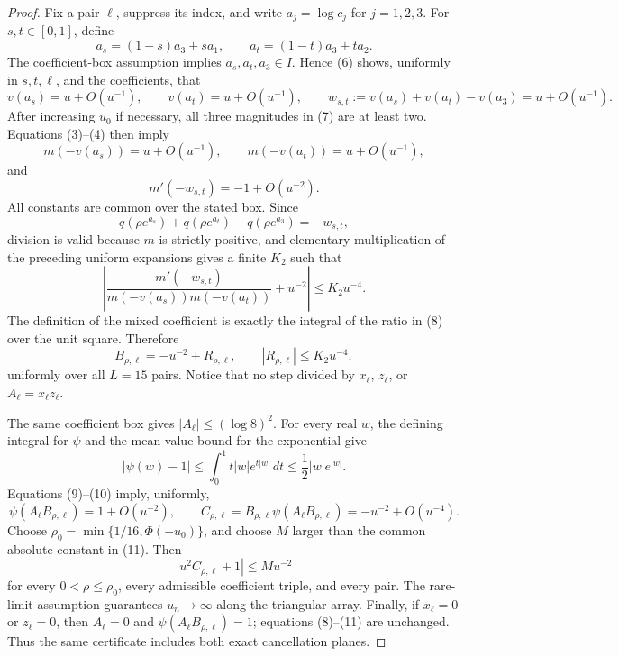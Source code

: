 \documentclass{article}
\begin{document}
\begin{proof}
Fix a pair \(\ell\), suppress its index, and write \(a_j=\log c_j\) for \(j=1,2,3\).  For \(s,t\in[0,1]\), define
\[
a_s=(1-s)a_3+sa_1,
\qquad a_t=(1-t)a_3+ta_2.
\]
The coefficient-box assumption implies \(a_s,a_t,a_3\in I\).  Hence (6) shows, uniformly in \(s,t,\ell\), and the coefficients, that
\[
v(a_s)=u+O(u^{-1}),\qquad
v(a_t)=u+O(u^{-1}),\qquad
w_{s,t}:=v(a_s)+v(a_t)-v(a_3)=u+O(u^{-1}).
\tag{7}
\]
After increasing \(u_0\) if necessary, all three magnitudes in (7) are at least two.  Equations (3)--(4) then imply
\[
m(-v(a_s))=u+O(u^{-1}),\qquad
m(-v(a_t))=u+O(u^{-1}),
\]
and
\[
m'(-w_{s,t})=-1+O(u^{-2}).
\]
All constants are common over the stated box.  Since
\[
q(\rho e^{a_s})+q(\rho e^{a_t})-q(\rho e^{a_3})=-w_{s,t},
\]
division is valid because \(m\) is strictly positive, and elementary multiplication of the preceding uniform expansions gives a finite \(K_2\) such that
\[
\left|
\frac{m'(-w_{s,t})}{m(-v(a_s))m(-v(a_t))}+u^{-2}
\right|\leq K_2u^{-4}.
\tag{8}
\]
The definition of the mixed coefficient is exactly the integral of the ratio in (8) over the unit square.  Therefore
\[
B_{\rho,\ell}=-u^{-2}+R_{\rho,\ell},
\qquad |R_{\rho,\ell}|\leq K_2u^{-4},
\tag{9}
\]
uniformly over all \(L=15\) pairs.  Notice that no step divided by \(x_\ell\), \(z_\ell\), or \(A_\ell=x_\ell z_\ell\).

The same coefficient box gives \(|A_\ell|\leq(\log8)^2\).  For every real \(w\), the defining integral for \(\psi\) and the mean-value bound for the exponential give
\[
|\psi(w)-1|
\leq\int_0^1t|w|e^{t|w|}\,dt
\leq\frac12|w|e^{|w|}.
\tag{10}
\]
Equations (9)--(10) imply, uniformly,
\[
\psi(A_\ell B_{\rho,\ell})=1+O(u^{-2}),
\qquad
C_{\rho,\ell}=B_{\rho,\ell}\psi(A_\ell B_{\rho,\ell})
=-u^{-2}+O(u^{-4}).
\tag{11}
\]
Choose \(\rho_0=\min\{1/16,\Phi(-u_0)\}\), and choose \(M\) larger than the common absolute constant in (11).  Then
\[
|u^2C_{\rho,\ell}+1|\leq Mu^{-2}
\]
for every \(0<\rho\leq\rho_0\), every admissible coefficient triple, and every pair.  The rare-limit assumption guarantees \(u_n\to\infty\) along the triangular array.  Finally, if \(x_\ell=0\) or \(z_\ell=0\), then \(A_\ell=0\) and \(\psi(A_\ell B_{\rho,\ell})=1\); equations (8)--(11) are unchanged.  Thus the same certificate includes both exact cancellation planes.
\end{proof}
\end{document}
